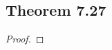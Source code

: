 \documentclass[../../main.tex]{subfiles}
\begin{document}
\subsection{Theorem 7.27}
\begin{wts}

\end{wts}
\begin{proof}

\end{proof}
\end{document}
